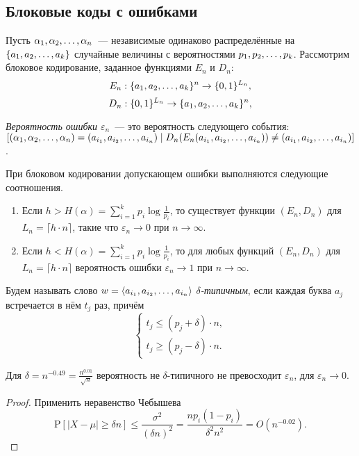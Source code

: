 \documentclass[12pt]{article}
\begin{document}
\subsection{Блоковые коды с ошибками}
Пусть ${\alpha}_1,{\alpha}_2,\dotsc,{\alpha}_{n}$~--- независимые одинаково распределённые на
$\{{a}_1,{a}_2,\dotsc,{a}_{k}\}$ случайные величины с вероятностями ${p}_1,{p}_2,\dotsc,{p}_{k}$.
Рассмотрим блоковое кодирование, заданное функциями $E_n$ и $D_n$:
\[
    E_n:\{{a}_1,{a}_2,\dotsc,{a}_{k}\}^n \to \{0,1\}^{L_n},
\]
\[
    D_n:\{0,1\}^{L_n} \to \{{a}_1,{a}_2,\dotsc,{a}_{k}\}^n ,
\]
\begin{definition}
    \emph{Вероятность ошибки $\varepsilon_n$}~--- это вероятность следующего
    события: $[({\alpha}_1,{\alpha}_2,\dotsc,{\alpha}_{n}) = ({a}_{{i}_1},{a}_{{i}_2},\dotsc,{a}_{{i}_{n}}) \mid
    D_n(E_n({a}_{{i}_1},{a}_{{i}_2},\dotsc,{a}_{{i}_{n}}))\neq ({a}_{{i}_1},{a}_{{i}_2},\dotsc,{a}_{{i}_{n}})]$.
\end{definition}
\begin{theorem}[Шеннон]\label{thm:blockcoding}
    При блоковом кодировании допускающем ошибки выполняются следующие
    соотношения.
    \begin{enumerate}
        \item Если $h > H(\alpha) = \sum_{i=1}^{k} p_i\log\frac{1}{p_i}$, то
            существует функции $(E_n, D_n)$ для $L_n = \lceil h\cdot n \rceil$,
            такие что $\varepsilon_n\to0$ при $n\to\infty$.

        \item Если $h < H(\alpha) = \sum_{i=1}^{k} p_i\log\frac{1}{p_i}$, то
            для любых функций $(E_n, D_n)$ для $L_n = \lceil h\cdot n \rceil$
            вероятность ошибки $\varepsilon_n\to1$ при $n\to\infty$.
    \end{enumerate}
\end{theorem}
\begin{definition}
    Будем называть слово $w=\langle{a}_{{i}_1},{a}_{{i}_2},\dotsc,{a}_{{i}_{n}}\rangle$ \emph{$\delta$-типичным}, если
    каждая буква $a_j$ встречается в нём $t_j$ раз, причём
    \[
    \begin{cases}
        t_j\le (p_j + \delta)\cdot n,\\
        t_j\ge (p_j - \delta)\cdot n.
    \end{cases}
    \]
\end{definition}
\begin{lemma}\label{lm:typicalwordprob}
    Для $\delta = n^{-0.49} = \frac{n^{0.01}}{\sqrt n}$ вероятность не
    $\delta$-типичного не превосходит $\varepsilon_n$, для $\varepsilon_n\to 0$.
\end{lemma}
\begin{proof}
    Применить неравенство Чебышева
    \[
    \mathrm {P}[|X-\mu |\ge \delta n]\le \frac {\sigma^2}{(\delta n)^2} =
    \frac{np_i(1-p_i)}{\delta^2 n^2} = O(n^{-0.02}). 
    \]
\end{proof}
\end{document}
